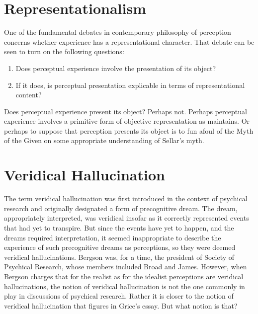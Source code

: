 \documentclass[12pt]{article}
\begin{document}

\section{Representationalism} %
\label{sec:representationalism}

One of the fundamental debates in contemporary philosophy of perception concerns whether experience has a representational character. That debate can be seen to turn on the following questions:
\begin{enumerate}
	\item Does perceptual experience involve the presentation of its object?
	\item If it does, is perceptual presentation explicable in terms of representational content?
\end{enumerate}

Does perceptual experience present its object? Perhaps not. Perhaps perceptual experience involves a primitive form of objective representation as \citet{Burge:2010uq} maintains. Or perhaps to suppose that perception presents its object is to fun afoul of the Myth of the Given on some appropriate understanding of Sellar's \citeyearpar{Sellars:1956xp} myth. 




\section{Veridical Hallucination} %
\label{sec:veridical_hallucination}

The term veridical hallucination was first introduced in the context of psychical research and originally designated a form of precognitive dream. The dream, appropriately interpreted, was veridical insofar as it correctly represented events that had yet to transpire. But since the events have yet to happen, and the dreams required interpretation, it seemed inappropriate to describe the experience of such precognitive dreams as perceptions, so they were deemed veridical hallucinations. Bergson was, for a time, the president of Society of Psychical Research, whose members included Broad and James. However, when Bergson charges that for the realist as for the idealist perceptions are veridical hallucinations, the notion of veridical hallucination is not the one commonly in play in discussions of psychical research. Rather it is closer to the notion of veridical hallucination that figures in Grice's \citeyearpar{Grice:1962jw} essay. But what notion is that?
\end{document}
